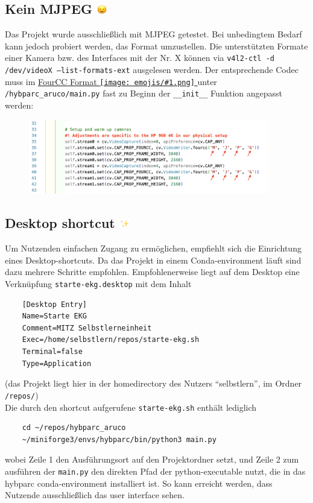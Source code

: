 \documentclass[a4paper, 10pt]{article}
\newcommand{\code}[1]{\texttt{#1}}
\newcommand{\emoji}[1]{
    \begingroup\normalfont
    \texttt{[image: emojis/\#1.png]}
    \endgroup
}
\begin{document}
\subsection{Kein MJPEG \includegraphics[height=0.75em]{emojis/open-mouth.png}}
\label{ssec:the-mjpeg-problem}
Das Projekt wurde ausschließlich mit MJPEG getestet. Bei unbedingtem Bedarf kann jedoch probiert werden, das Format umzustellen. Die unterstützten Formate einer Kamera bzw. des Interfaces mit der Nr. X können via \code{v4l2-ctl -d /dev/videoX --list-formats-ext} ausgelesen werden. Der entsprechende Codec muss im \href{https://fourcc.org/codecs.php}{FourCC Format\emoji{link}} unter \code{/hybparc\_aruco/main.py} fast zu Beginn der \code{\_\_init\_\_} Funktion angepasst werden:
\begin{figure}[H]
    \centering
    \includegraphics[width=10.5cm]{fourcc.png}
\end{figure}

\subsection{Desktop shortcut \includegraphics[height=0.75em]{emojis/sparkles.png}}
\label{ssec:desktop-drip}
Um Nutzenden einfachen Zugang zu ermöglichen, empfiehlt sich die Einrichtung eines Desktop-shortcuts. Da das Projekt in einem Conda-environment läuft sind dazu mehrere Schritte empfohlen. Empfohlenerweise liegt auf dem Desktop eine Verknüpfung \code{starte-ekg.desktop} mit dem Inhalt
\begin{verbatim}
    [Desktop Entry]
    Name=Starte EKG
    Comment=MITZ Selbstlerneinheit
    Exec=/home/selbstlern/repos/starte-ekg.sh
    Terminal=false
    Type=Application
\end{verbatim}
{\footnotesize(das Projekt liegt hier in der homedirectory des Nutzers \enquote{selbstlern}, im Ordner \code{/repos/})}\\
Die durch den shortcut aufgerufene \code{starte-ekg.sh} enthält lediglich
\begin{verbatim}
    cd ~/repos/hybparc_aruco
    ~/miniforge3/envs/hybparc/bin/python3 main.py
\end{verbatim}
wobei Zeile 1 den Ausführungsort auf den Projektordner setzt, und Zeile 2 zum ausführen der \code{main.py} den direkten Pfad der python-executable nutzt, die in das hybparc conda-environment installiert ist. So kann erreicht werden, dass Nutzende ausschließlich das user interface sehen.
\end{document}
